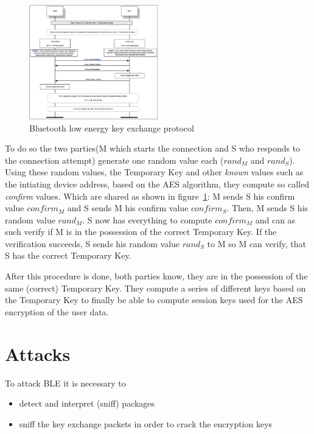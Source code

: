 \documentclass[conference]{IEEEtran}
\begin{document}
\begin{figure}
  \centering
    \includegraphics[width=0.5\textwidth]{keyexchange}
    \caption{Bluetooth low energy key exchange protocol \cite{ble40}}
  \label{fig:keyexchange}
\end{figure}

To do so the two parties(M which starts the connection and S who responds to the connection attempt) generate one random value each ($rand_M$ and $rand_S$). Using these random values, the Temporary Key and other \emph{known} values such as the intiating device address, based on the AES algorithm, they compute so called \emph{confirm} values. Which are shared as shown in figure~\ref{fig:keyexchange}: M sends S his confirm value $confirm_M$ and S sends M his confirm value $confirm_S$. Then, M sends S his random value $rand_M$. S now has everything to compute $confirm_M$ and can as such verify if M is in the possession of the correct Temporary Key. If the verification succeeds, S sends his random value $rand_S$ to M so M can verify, that S has the correct Temporary Key.

After this procedure is done, both parties know, they are in the possession of the same (correct) Temporary Key. They compute a series of different keys based on the Temporary Key to finally be able to compute session keys used for the AES encryption of the user data.

\section{Attacks}
\label{attacks}

To attack BLE it is necessary to
\begin{itemize}
  \item detect and interpret (sniff) packages
  \item sniff the key exchange packets in order to crack the encryption keys
\end{itemize}
\end{document}
